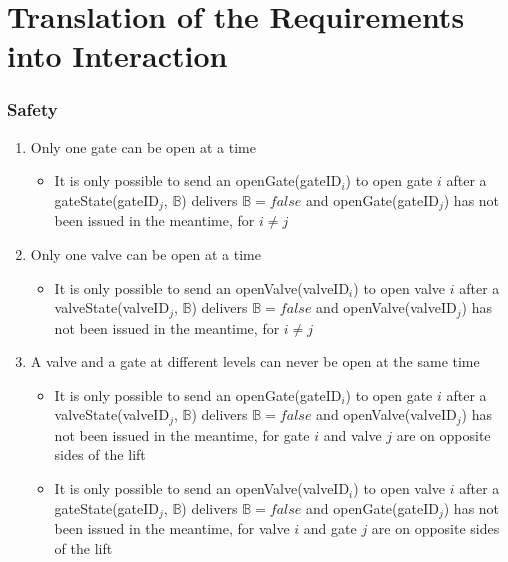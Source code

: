 \section{Translation of the Requirements into Interaction}

\subsubsection*{Safety}
\begin{enumerate}
	\item Only one gate can be open at a time
		\begin{itemize}
			\item It is only possible to send an openGate(gateID$_i$) to open gate $i$ after a gateState(gateID$_j$, $ \mathbb{B} $) delivers $\mathbb{B} = false$ and openGate(gateID$_j$) has not been issued in the meantime, for $i \neq j$
		\end{itemize}
	
	\item Only one valve can be open at a time
	
		\begin{itemize}
			\item It is only possible to send an openValve(valveID$_i$) to open valve $i$ after a valveState(valveID$_j$, $ \mathbb{B} $) delivers $\mathbb{B} = false$ and openValve(valveID$_j$) has not been issued in the meantime, for $i \neq j$
		\end{itemize}
	
	\item A valve and a gate at different levels can never be open at the same time
		\begin{itemize}
			\item It is only possible to send an openGate(gateID$_i$) to open gate $i$ after a valveState(valveID$_j$, $ \mathbb{B} $) delivers $\mathbb{B} = false$ and openValve(valveID$_j$) has not been issued in the meantime, for gate $i$ and valve $j$ are on opposite sides of the lift 
			\item It is only possible to send an openValve(valveID$_i$) to open valve $i$ after a gateState(gateID$_j$, $ \mathbb{B} $) delivers $\mathbb{B} = false$ and openGate(gateID$_j$) has not been issued in the meantime, for valve $i$ and gate $j$ are on opposite sides of the lift
		\end{itemize}
	
	

\end{enumerate}
